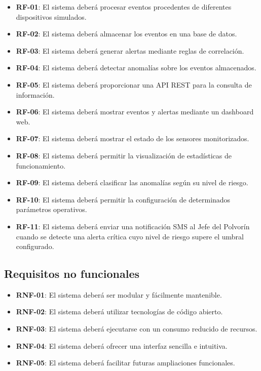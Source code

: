 \begin{itemize}
\item \textbf{RF-01}: El sistema deberá procesar eventos procedentes de diferentes dispositivos simulados.
\item \textbf{RF-02}: El sistema deberá almacenar los eventos en una base de datos.
\item \textbf{RF-03}: El sistema deberá generar alertas mediante reglas de correlación.
\item \textbf{RF-04}: El sistema deberá detectar anomalías sobre los eventos almacenados.
\item \textbf{RF-05}: El sistema deberá proporcionar una API REST para la consulta de información.
\item \textbf{RF-06}: El sistema deberá mostrar eventos y alertas mediante un dashboard web.
\item \textbf{RF-07}: El sistema deberá mostrar el estado de los sensores monitorizados.
\item \textbf{RF-08}: El sistema deberá permitir la visualización de estadísticas de funcionamiento.
\item \textbf{RF-09}: El sistema deberá clasificar las anomalías según su nivel de riesgo.
\item \textbf{RF-10}: El sistema deberá permitir la configuración de determinados parámetros operativos.
\item \textbf{RF-11}: El sistema deberá enviar una notificación SMS al Jefe del Polvorín cuando se detecte una alerta crítica cuyo nivel de riesgo supere el umbral configurado.
\end{itemize}

\subsection{Requisitos no funcionales}

\begin{itemize}
\item \textbf{RNF-01}: El sistema deberá ser modular y fácilmente mantenible.
\item \textbf{RNF-02}: El sistema deberá utilizar tecnologías de código abierto.
\item \textbf{RNF-03}: El sistema deberá ejecutarse con un consumo reducido de recursos.
\item \textbf{RNF-04}: El sistema deberá ofrecer una interfaz sencilla e intuitiva.
\item \textbf{RNF-05}: El sistema deberá facilitar futuras ampliaciones funcionales.
\end{itemize}

